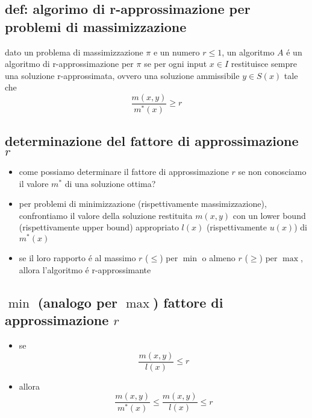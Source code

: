 
\subsection*{def: algorimo di r-approssimazione per problemi di massimizzazione}
\begin{flushleft}
	dato un problema di massimizzazione $\pi$ e un numero $r\leq 1$, un algoritmo $A$ \'e un algoritmo di r-approssimazione per $\pi$ se per ogni input $x\in I$ restituisce sempre una soluzione r-approssimata, ovvero una soluzione ammissibile $y\in S(x)$ tale che
	$$\frac{m(x,y)}{m^*(x)}\geq r$$
\end{flushleft}


\subsection*{determinazione del fattore di approssimazione $r$}
\begin{flushleft}
	\begin{itemize}
		\item come possiamo determinare il fattore di approssimazione $r$ se non conosciamo il valore $m^*$ di una soluzione ottima?
		\item per problemi di minimizzazione (rispettivamente massimizzazione), confrontiamo il valore della soluzione restituita $m(x,y)$ con un lower bound (rispettivamente upper bound) appropriato $l(x)$ (rispettivamente $u(x)$) di $m^*(x)$
		\item se il loro rapporto \'e al massimo $r$ ($\leq$) per $\min$ o almeno $r$ ($\geq$) per $\max$, allora l'algoritmo \'e r-approssimante
	\end{itemize}
\end{flushleft}


\subsection*{$\min$ (analogo per $\max$) fattore di approssimazione $r$}
\begin{flushleft}
	\begin{itemize}
		\item se $$\frac{m(x,y)}{l(x)}\leq r$$
		\item allora $$\frac{m(x,y)}{m^*(x)}\leq\frac{m(x,y)}{l(x)}\leq r$$
	\end{itemize}
\end{flushleft}

